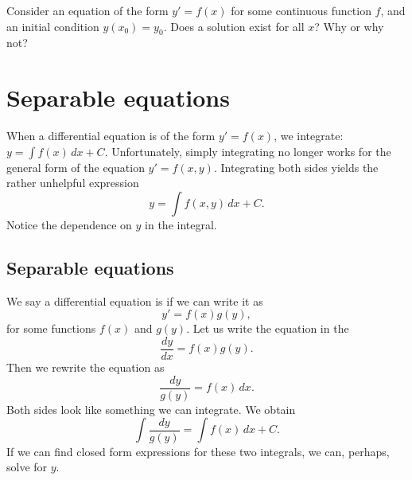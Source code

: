 \begin{exercise}
Consider an equation of the form $y' = f(x)$ for some continuous function
$f$, and an initial condition $y(x_0) = y_0$.  Does a
solution exist for all $x$?  Why or why not?
\end{exercise}


\sectionnewpage
\section{Separable equations}
\label{separable:section}


When a differential equation is of the form
$y' = f(x)$,
we integrate:
$y = \int f(x) \,dx + C$. 
Unfortunately, simply integrating no longer works for the
general form of the equation
$y' = f(x,y)$.
Integrating both sides yields the rather unhelpful expression
\begin{equation*}
y = \int f(x,y) \,dx + C .
\end{equation*}
Notice the dependence on $y$ in the integral.

\subsection{Separable equations}

We say a differential equation is
\emph{}
if we can write it as
\begin{equation*}
y' = f(x)g(y) ,
\end{equation*}
for some functions $f(x)$ and $g(y)$.
Let us write the equation in the 
\begin{equation*}
\frac{dy}{dx} = f(x)g(y) .
\end{equation*}
Then we rewrite the equation as
\begin{equation*}
\frac{dy}{g(y)} = f(x) \,dx .
\end{equation*}
Both sides look like something we can integrate.  We obtain
\begin{equation*}
\int \frac{dy}{g(y)} = \int f(x) \,dx + C .
\end{equation*}
If we can find closed form expressions
for these two integrals, we can, perhaps, solve for $y$.

